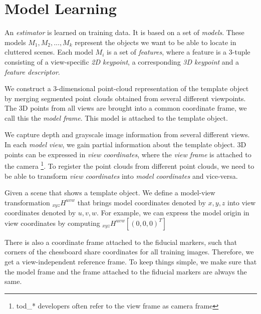 
\section{Model Learning}

An {\it estimator} is learned on training data. It is based on a set of {\it
models}. These models ${M_1, M_2, ..., M_k}$ represent the objects we want to
be able to locate in cluttered scenes. Each model $M_i$ is a set of {\it
features}, where a feature is a 3-tuple consisting of a view-specific {\it 2D
keypoint}, a corresponding {\it 3D keypoint} and a {\it feature descriptor}.

We construct a 3-dimensional point-cloud representation of the template object
by merging segmented point clouds obtained from several different viewpoints.
The 3D points from all views are brought into a common coordinate frame, we
call this the {\it model frame}. This model is attached to the template object.

We capture depth and grayscale image information from several different views.
In each {\it model view}, we gain partial information about the template
object. 3D points can be expressed in {\it view coordinates}, where the {\it
view frame} is attached to the camera \footnote{tod\_* developers often refer
to the view frame as camera frame}. To register the point clouds from different
point clouds, we need to be able to transform {\it view coordinates} into
{\it model coordinates} and vice-versa.


Given a scene that shows a template object. We define a model-view
transformation $_{xyz}H^{uvw}$ that brings model coordinates denoted by $x,y,z$
into view coordinates denoted by $u,v,w$. For example, we can express the model origin
in view coordinates by computing $_{xyz}H^{uvw}[(0, 0, 0)^T]$

There is also a coordinate frame attached to the fiducial markers, such that
corners of the chessboard share coordinates for all training images. Therefore,
we get a view-independent reference frame. To keep things simple, we make sure
that the model frame and the frame attached to the fiducial markers are always
the same.

